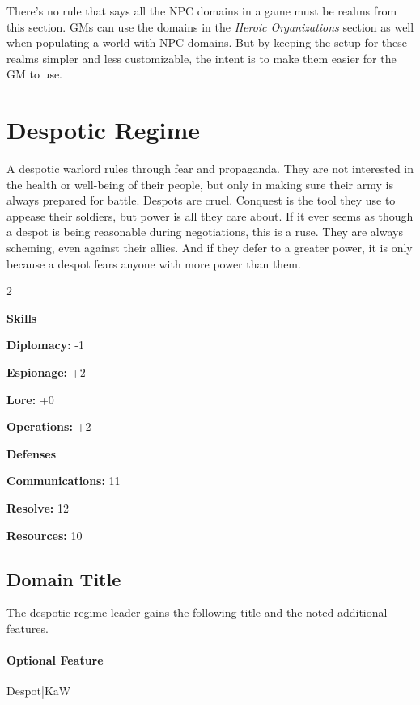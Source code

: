 \documentclass[10pt,a4paper,twoside,bg=print,twocolumn,openany,nodeprecatedcode]{dndbook}
\begin{document}
There's no rule that says all the NPC domains in a game must be realms from this section. GMs can use the domains in the \textit{Heroic Organizations} section as well when populating a world with NPC domains. But by keeping the setup for these realms simpler and less customizable, the intent is to make them easier for the GM to use.

\section{Despotic Regime}
A despotic warlord rules through fear and propaganda. They are not interested in the health or well-being of their people, but only in making sure their army is always prepared for battle. Despots are cruel. Conquest is the tool they use to appease their soldiers, but power is all they care about. If it ever seems as though a despot is being reasonable during negotiations, this is a ruse. They are always scheming, even against their allies. And if they defer to a greater power, it is only because a despot fears anyone with more power than them.


\begin{itemize}
\begin{multicols}{2}
\item \textbf{Skills}
\item \textbf{Diplomacy:} -1
\item \textbf{Espionage:} +2
\item \textbf{Lore:} +0
\item \textbf{Operations:} +2
\item \textbf{Defenses}
\item \textbf{Communications:} 11
\item \textbf{Resolve:} 12
\item \textbf{Resources:} 10
\end{multicols}

\end{itemize}

\subsection{Domain Title}
The despotic regime leader gains the following title and the noted additional features.

\paragraph{Optional Feature}
Despot|KaW
\end{document}
